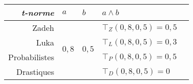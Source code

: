\begin{tabular}{rllll}
  \toprule
  \emph{t-norme} &\(a\)&\(b\)& \(a \wedge{} b\) \\
  \midrule
  Zadeh & \multirow{4}{*}{\(0,8\)} & \multirow{4}{*}{\(0,5\)} & \(⊤_Z(0,8, 0,5) = 0,5 \) \\
  Luka &  &  & \(⊤_L(0,8, 0,5) = 0,3\) \\
  Probabilistes &  &  & \(⊤_P(0,8,0,5) = 0,5 \) \\
  Drastiques &  &  & \(⊤_D(0,8, 0,5) = 0 \) \\
  \bottomrule
\end{tabular}